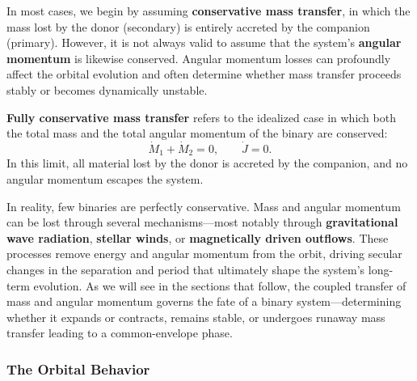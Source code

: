 \par
In most cases, we begin by assuming \textbf{conservative mass transfer}, in which the mass lost by the donor (secondary) is entirely accreted by the companion (primary). However, it is not always valid to assume that the system’s \textbf{angular momentum} is likewise conserved. Angular momentum losses can profoundly affect the orbital evolution and often determine whether mass transfer proceeds stably or becomes dynamically unstable.

\begin{definition}
\textbf{Fully conservative mass transfer} refers to the idealized case in which both the total mass and the total angular momentum of the binary are conserved:
\[
\dot{M}_1 + \dot{M}_2 = 0, \qquad \dot{J} = 0.
\]
In this limit, all material lost by the donor is accreted by the companion, and no angular momentum escapes the system.
\end{definition}

\par
In reality, few binaries are perfectly conservative.  Mass and angular momentum can be lost through several mechanisms—most notably through \textbf{gravitational wave radiation}, \textbf{stellar winds}, or \textbf{magnetically driven outflows}.  These processes remove energy and angular momentum from the orbit, driving secular changes in the separation and period that ultimately shape the system’s long-term evolution.
\medskip
\noindent
As we will see in the sections that follow, the coupled transfer of mass and angular momentum governs the fate of a binary system—determining whether it expands or contracts, remains stable, or undergoes runaway mass transfer leading to a common-envelope phase.

\subsubsection{The Orbital Behavior}

